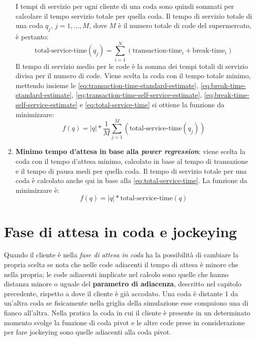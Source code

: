 \begin{enumerate}
I tempi di servizio per ogni cliente di una coda sono quindi sommati per calcolare il tempo servizio totale per quella coda. Il tempo di servizio totale di una coda $q_j$, $j = 1,\ldots ,M$, dove $M$ è il numero totale di code del supermercato, è pertanto:
\begin{equation}\label{eq:total-service-time}
\text{total-service-time}(q_j) = \sum\limits_{i=1}^N \left( \text{transaction-time}_i + \text{break-time}_i \right)
\end{equation}
Il tempo di servizio medio per le code è la somma dei tempi totali di servizio divisa per il numero di code. Viene scelta la coda con il tempo totale minimo, mettendo insieme le \ref{eq:transaction-time-standard-estimate}, \ref{eq:break-time-standard-estimate}, \ref{eq:transaction-time-self-service-estimate}, \ref{eq:break-time-self-service-estimate} e \ref{eq:total-service-time} si ottiene la funzione da minimizzare:
\begin{equation}
f(q) = |q| * \frac{1}{M}\sum\limits_{j=1}^M \left( \text{total-service-time}(q_j) \right)
\end{equation}
\item \textbf{Minimo tempo d'attesa in base alla \textit{power regression}}: viene scelta la coda con il tempo d'attesa minimo, calcolato in base al tempo di transazione e il tempo di pausa medi per quella coda. Il tempo di servizio totale per una coda è calcolato anche qui in base alla \ref{eq:total-service-time}. La funzione da minimizzare è:
\begin{equation}
f(q) = |q| * \text{total-service-time}(q)
\end{equation}
\end{enumerate}

\section{Fase di attesa in coda e jockeying}

Quando il cliente è nella \textit{fase di attesa in coda} ha la possibilità di cambiare la propria scelta se nota che nelle code adiacenti il tempo di attesa è minore che nella propria; le code adiacenti implicate nel calcolo sono quelle che hanno distanza minore o uguale del \textbf{parametro di adiacenza}, descritto nel capitolo precedente, rispetto a dove il cliente è già accodato. Una coda è distante 1 da un'altra coda se fisicamente nella griglia della simulazione esse compaiono una di fianco all'altra. Nella pratica la coda in cui il cliente è presente in un determinato momento svolge la funzione di coda pivot e le altre code prese in considerazione per fare jockeying sono quelle adiacenti alla coda pivot.

